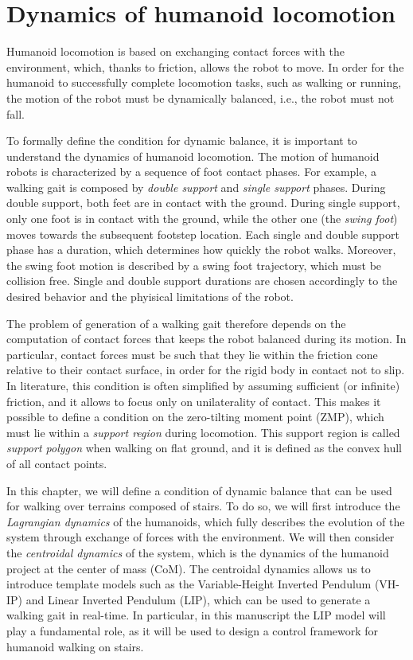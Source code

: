 \chapter{Dynamics of humanoid locomotion}
Humanoid locomotion is based on exchanging contact forces with the environment,
which, thanks to friction, allows the robot to move. In order for the humanoid to
successfully complete locomotion tasks, such as walking or running, the motion
of the robot must be dynamically balanced, i.e., the robot must not fall.

To formally define the condition for dynamic balance, it is important
to understand the dynamics of humanoid locomotion. The motion of humanoid robots
is characterized by a sequence of foot contact phases. For example, a walking
gait is composed by \textit{double support} and \textit{single support} phases. During
double support, both feet are in contact with the ground. During single support,
only one foot is in contact with the ground, while the other one (the \textit{swing foot})
moves towards the subsequent footstep location. Each single and double support
phase has a duration, which determines how quickly the robot walks. Moreover,
the swing foot motion is described by a swing foot trajectory, which must be
collision free. Single and double support durations are chosen accordingly to 
the desired behavior and the phyisical limitations of the robot.

The problem of generation of a walking gait therefore depends on the
computation of contact forces that keeps the robot balanced during its motion.
In particular, contact forces must be such that they lie within the friction cone
relative to their contact surface, in order for the rigid body in contact not to slip. 
In literature, this condition is often simplified by assuming sufficient (or
infinite) friction, and it allows to focus only on unilaterality of contact.
This makes it possible to define a condition on the zero-tilting moment point
(ZMP), which must lie within a \textit{support region} during locomotion. This
support region is called \textit{support polygon} when walking on flat ground,
and it is defined as the convex hull of all contact points.

In this chapter, we will define a condition of dynamic balance that can be
used for walking over terrains composed of stairs. To do so, we will first introduce the 
\textit{Lagrangian dynamics} of the humanoids, which fully describes the evolution
of the system through exchange of forces with the environment. We will then 
consider the \textit{centroidal dynamics} of the system, which is the 
dynamics of the humanoid project at the center of mass (CoM). The centroidal
dynamics allows us to introduce template models such as the Variable-Height
Inverted Pendulum (VH-IP) and Linear Inverted Pendulum (LIP), which can be used to generate
a walking gait in real-time. In particular, in this manuscript the LIP model
will play a fundamental role, as it will be used to design a control framework
for humanoid walking on stairs.

